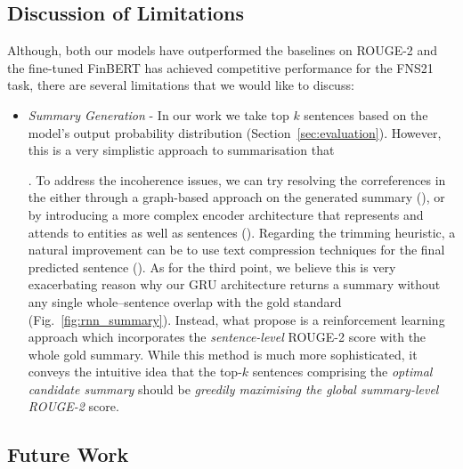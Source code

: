 \subsection{Discussion of Limitations}\label{subsec:limitations}
Although, both our models have outperformed the baselines on ROUGE-2 and the fine-tuned FinBERT has achieved competitive
performance for the FNS21 task, there are several limitations that we would like to discuss:
\begin{itemize}
    \item \emph{Summary Generation} - In our work we take top $k$ sentences based on the model's output probability distribution (Section~\ref{sec:evaluation}).
        However, this is a very simplistic approach to summarisation that
        .
        To address the incoherence issues, we can try resolving the correferences in the either through a
        graph-based approach on the generated summary (\cite{sonawane2016coreference}), or by introducing a more complex
        encoder architecture that represents and attends to entities as well as sentences (\cite{Huang2021ExtractiveSC}).
        Regarding the trimming heuristic, a natural improvement can be to use text compression techniques for the final predicted sentence (\cite{ghalandari2022efficient, KNIGHT200291}).
        As for the third point, we believe this is very exacerbating reason why our GRU architecture returns a summary
        without any single whole--sentence overlap with the gold standard (Fig.~\ref{fig:rnn_summary}).
        Instead, what \cite{zmandar-etal-2021-joint} propose is a reinforcement learning approach which incorporates
        the \emph{sentence-level} ROUGE-2 score with the whole gold summary.
        While this method is much more sophisticated, it conveys the intuitive idea that the top-$k$ sentences comprising the
        \emph{optimal candidate summary} should be \emph{greedily maximising the global summary-level ROUGE-2} score.
\end{itemize}

\subsection{Future Work}\label{subsec:future-work}